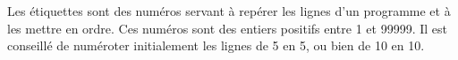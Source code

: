 Les étiquettes sont des numéros servant à repérer les lignes d'un programme et à les mettre en ordre.
Ces numéros sont des entiers positifs entre 1 et 99999.
Il est conseillé de numéroter initialement les lignes de 5 en 5, ou bien de 10 en 10.